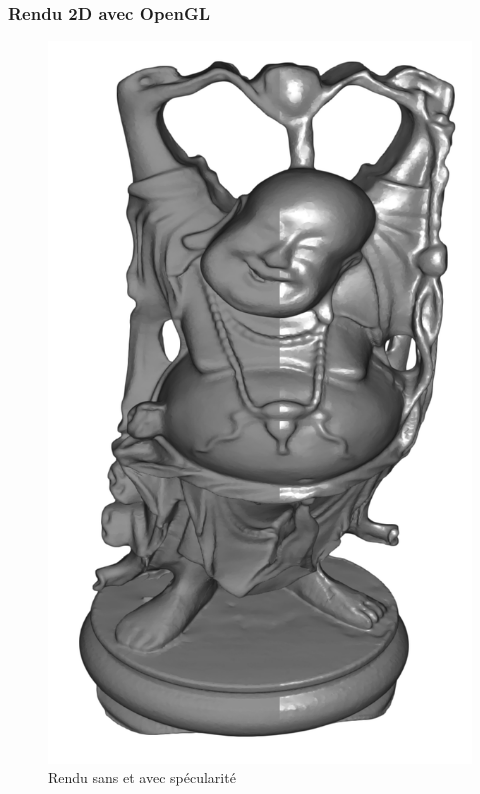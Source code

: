 \documentclass{beamer}
\begin{document}
\begin{frame}
\frametitle{Rendu 2D avec OpenGL}
\begin{figure}
\centering
\includegraphics[scale=0.15]{rendu_specular.png}
\caption{Rendu sans  et avec spécularité}
\end{figure}

\end{frame}

\end{document}
